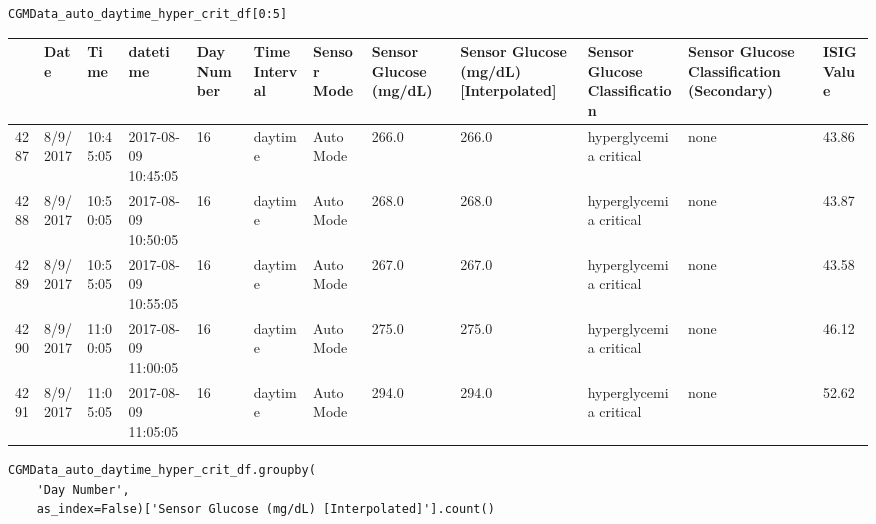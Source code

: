 \bigskip

\begin{verbatim}
CGMData_auto_daytime_hyper_crit_df[0:5]
\end{verbatim}

\bigskip\noindent
\begin{tabular}{p{}p{}p{}p{}p{}p{}p{}p{}p{}p{}p{}p{}}
\toprule
 & Date & Time & datetime & Day Number & Time Interval & Sensor Mode & Sensor Glucose (mg/dL) & Sensor Glucose (mg/dL) [Interpolated] & Sensor Glucose Classification & Sensor Glucose Classification (Secondary) & ISIG Value \\
\hline
4287 & 8/9/2017 & 10:45:05 & 2017-08-09 10:45:05 & 16 & daytime & Auto Mode & 266.0 & 266.0 & hyperglycemia critical & none & 43.86 \\
\hline
4288 & 8/9/2017 & 10:50:05 & 2017-08-09 10:50:05 & 16 & daytime & Auto Mode & 268.0 & 268.0 & hyperglycemia critical & none & 43.87 \\
\hline
4289 & 8/9/2017 & 10:55:05 & 2017-08-09 10:55:05 & 16 & daytime & Auto Mode & 267.0 & 267.0 & hyperglycemia critical & none & 43.58 \\
\hline
4290 & 8/9/2017 & 11:00:05 & 2017-08-09 11:00:05 & 16 & daytime & Auto Mode & 275.0 & 275.0 & hyperglycemia critical & none & 46.12 \\
\hline
4291 & 8/9/2017 & 11:05:05 & 2017-08-09 11:05:05 & 16 & daytime & Auto Mode & 294.0 & 294.0 & hyperglycemia critical & none & 52.62 \\
\hline
\bottomrule
\end{tabular}

\bigskip

\begin{verbatim}
CGMData_auto_daytime_hyper_crit_df.groupby(
    'Day Number', 
    as_index=False)['Sensor Glucose (mg/dL) [Interpolated]'].count()
\end{verbatim}

